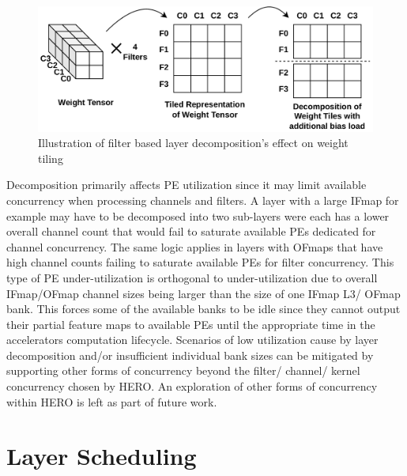 \begin{figure}[ht]
    \centering
    \includegraphics[scale=0.4]{fig/ofmap_decomposition_tiling_repr.pdf}
    \caption{Illustration of filter based layer decomposition's effect on weight tiling}
    \label{fig:ofmap_decomposition:weight_tiling}
\end{figure}

Decomposition primarily affects PE utilization since it may limit available
concurrency when processing channels and filters. A layer with a large IFmap for
example may have to be decomposed into two sub-layers were each has a lower
overall channel count that would fail to saturate available PEs dedicated for
channel concurrency. The same logic applies in layers with OFmaps that have high
channel counts failing to saturate available PEs for filter concurrency. This
type of PE under-utilization is orthogonal to under-utilization due to overall
IFmap/OFmap channel sizes being larger than the size of one IFmap L3/ OFmap
bank. This forces some of the available banks to be idle since they cannot
output their partial feature maps to available PEs until the appropriate time in
the accelerators computation lifecycle. Scenarios of low utilization cause by
layer decomposition and/or insufficient individual bank sizes can be mitigated
by supporting other forms of concurrency beyond the filter/ channel/ kernel
concurrency chosen by HERO. An exploration of other forms of concurrency within
HERO is left as part of future work. 

\section{Layer Scheduling}
\label{chap:net_compile:layer_scheduling}

